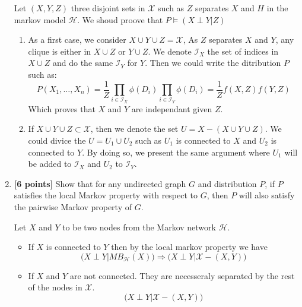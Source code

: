 \documentclass[12pt]{article} \usepackage[utf8]{inputenc}
\newcommand{\Ical}{\mathcal{I}}
\newcommand{\Hcal}{\mathcal{H}}
\newcommand{\Xcal}{\mathcal{X}}
\begin{document}
\begin{enumerate}
      \begin{solution}
        Let $(X,Y,Z)$ three disjoint sets in $\Xcal$ such as $Z$
        separates $X$ and $H$ in the markov model $\Hcal$. We shoud
        proove that $P \models (X \perp Y|Z)$

      \begin{enumerate}
        \item As a first case, we consider $X\cup Y \cup Z=\Xcal$, As
          $Z$ separates $X$ and $Y$,  any clique is either in $X\cup Z$ or
          $Y\cup Z$. We denote $\Ical_X$ the set of indices in
          $X\cup Z$ and do the same $\Ical_Y$ for $Y$. Then we could
          write the ditribution $P$ such as:
          \[
            P(X_1,\ldots,X_n) = \frac{1}{Z}
            \prod_{i\in\Ical_X}\phi(D_i)\prod_{i\in\Ical_Y}\phi(D_i)=
            \frac{1}{Z}f(X,Z)f(Y,Z)
          \]
          Which proves that $X$ and $Y$ are independant given $Z$.
        \item If $X\cup Y \cup Z \subset \Xcal$, then we denote the
          set $U = X - (X \cup Y \cup Z)$. We could divice the $U=U_1
          \cup U_2$ such as $U_1$ is connected to $X$ and $U_2$ is
          connected to $Y$. By doing so, we present the same
          argument where $U_1$ will be added to $\Ical_X$ and $U_2$
          to $\Ical_Y$.
      \end{enumerate}
      \end{solution}
    \item \textbf{[6 points]} Show that for any undirected graph $G$ and distribution $P$, if $P$ satisfies the local Markov property with respect to $G$, then $P$ will also satisfy the pairwise Markov property of $G$.

      \begin{solution}
       Let $X$ and $Y$ to be two nodes from the Markov network
       $\Hcal$. 

       \begin{itemize}
         \item If $X$ is connected to $Y$ then by the local markov
           property we have
           \[
             \big(X \perp Y| MB_{\Hcal}(X)) \Longrightarrow (X \perp Y
             | \Xcal - (X,Y)\big)
           \]
          \item If $X$ and $Y$ are not connected. They are necesseraly
            separated by the rest of the nodes in $\Xcal$.
            \[
              \big(X\perp Y | \Xcal - (X,Y)\big)
            \]
       \end{itemize}
      \end{solution}
\end{enumerate}
\end{document}
